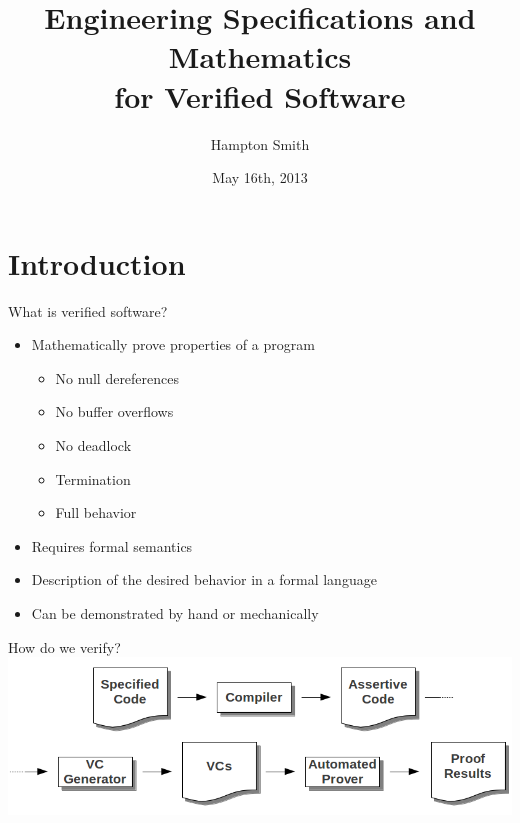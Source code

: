\documentclass{beamer}
\title[Engineering Specifications and Mathematics]{Engineering Specifications and Mathematics\\for Verified Software}
\author{Hampton Smith}
\institute{Clemson University}
\date{May 16th, 2013}
\begin{document}


\begin{frame}
\titlepage
\end{frame}

\section{Introduction}
\begin{frame}{What is verified software?}
	\begin{itemize}
		\item Mathematically prove properties of a program
		\begin{itemize}
			\item No null dereferences
			\item No buffer overflows
			\item No deadlock
			\item Termination
			\item Full behavior
		\end{itemize}
		\item Requires formal semantics
		\item Description of the desired behavior in a formal language
		\item Can be demonstrated by hand or mechanically
	\end{itemize}
\end{frame}


\begin{frame}{How do we verify?}
	\includegraphics[width=\textwidth]{verification_pipeline}
\end{frame}
\end{document}
